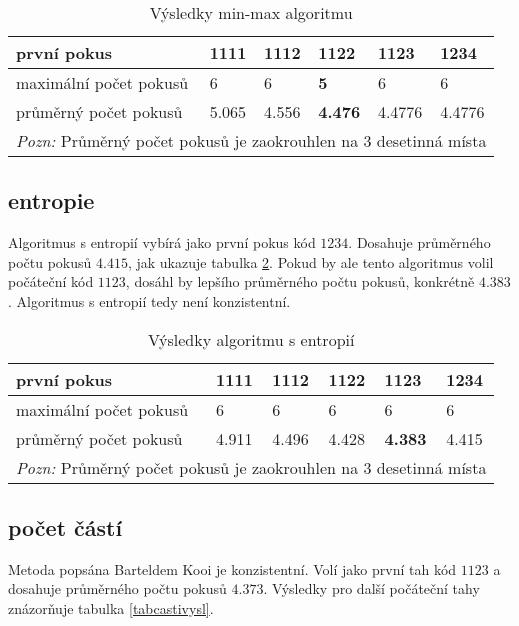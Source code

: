 \begin{table}[h]
\centering
\begin{tabular}{l l l l l l}
\toprule
první pokus & 1111 & 1112 & \textbf{1122} & 1123 & 1234 \\
\midrule

maximální počet pokusů 
& 6 & 6 & \textbf{5} & 6 & 6 \\

průměrný počet pokusů 
& 5.065 & 4.556 & \textbf{4.476} & 4.4776 & 4.4776\\
\bottomrule
\multicolumn{6}{l}{\footnotesize \textit{Pozn:}
Průměrný počet pokusů je zaokrouhlen na $3$ desetinná místa}
\end{tabular}
\caption{Výsledky min-max algoritmu}\label{tabminmaxvysl}
\end{table}

\subsection{entropie}

Algoritmus s entropií vybírá jako první pokus kód $1234$. Dosahuje průměrného počtu pokusů $4.415$, jak ukazuje tabulka \ref{tabentropievysl}. Pokud by ale tento algoritmus volil počáteční kód $1123$, dosáhl by lepšího průměrného počtu pokusů, konkrétně $4.383$. Algoritmus s entropií tedy není konzistentní. 

\begin{table}[h]
\centering
\begin{tabular}{l l l l l l}
\toprule
první pokus & 1111 & 1112 & 1122 & 1123 & \textbf{1234} \\
\midrule

maximální počet pokusů 
& 6 & 6 & 6 & 6 & 6 \\

průměrný počet pokusů 
& 4.911 & 4.496 & 4.428 & \textbf{4.383} & 4.415 \\
\bottomrule
\multicolumn{6}{l}{\footnotesize \textit{Pozn:}
Průměrný počet pokusů je zaokrouhlen na $3$ desetinná místa}
\end{tabular}
\caption{Výsledky algoritmu s entropií}\label{tabentropievysl}
\end{table}



\subsection{počet částí}
Metoda popsána Barteldem Kooi je konzistentní. Volí jako první tah kód $1123$ a dosahuje průměrného počtu pokusů $4.373$. Výsledky pro další počáteční tahy znázorňuje tabulka \ref{tabcastivysl}.



